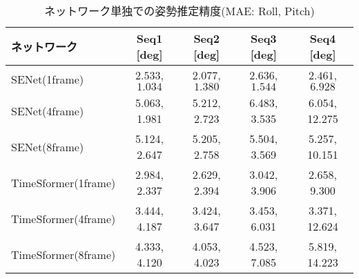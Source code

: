 \begin{table}[htbp]
\begin{center}
\caption{ネットワーク単独での姿勢推定精度(MAE: Roll, Pitch)}
  \begin{tabular}{l || c | c | c | c}\hline
      ネットワーク &  Seq1 [deg]& Seq2 [deg] & Seq3 [deg] & Seq4 [deg]\\ \hline
    SENet(1frame) & $\bm{2.533}$, $\bm{1.034}$ & $\bm{2.077}$, $\bm{1.380}$ & $\bm{2.636}$, $\bm{1.544}$ & $\bm{2.461}$, $\bm{6.928}$\\
    SENet(4frame) & 5.063, 1.981 & 5.212, 2.723 & 6.483, 3.535 & 6.054, 12.275 \\
    SENet(8frame) & 5.124, 2.647 & 5.205, 2.758 & 5.504, 3.569 & 5.257, 10.151 \\ \hline
    TimeSformer(1frame) & 2.984, 2.337 & 2.629, 2.394 & 3.042, 3.906 & 2.658, 9.300 \\
    TimeSformer(4frame) & 3.444, 4.187 & 3.424, 3.647 & 3.453, 6.031 & 3.371, 12.624 \\
    TimeSformer(8frame) & 4.333, 4.120 & 4.053, 4.023 & 4.523, 7.085 & 5.819, 14.223 \\ \hline
  \end{tabular}
  \label{tab:MAE_frame_infer_1}
\end{center}
\end{table}


